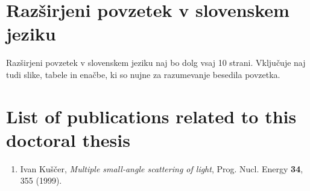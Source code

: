 \cleardoublepage{}
{}
\chapter*{Razširjeni povzetek v slovenskem jeziku}

\foreignlanguage{slovene}{  %
Razširjeni povzetek v slovenskem jeziku naj bo dolg vsaj 10 strani. 
Vključuje naj tudi slike, tabele in enačbe, ki so nujne za razumevanje besedila povzetka.
}


\cleardoublepage
\printindex


\cleardoublepage{}
{}
\chapter*{List of publications related to this doctoral thesis}


\begin{enumerate}

\item
Ivan Kuščer,
\textit{Multiple small-angle scattering of light},
Prog. Nucl. Energy
\textbf{34},
355 (1999).

\end{enumerate}



